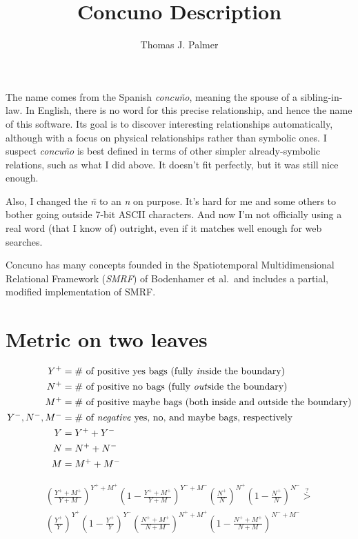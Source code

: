 \documentclass[12pt,twoside]{article}
\title{Concuno Description}
\author{Thomas J. Palmer}
\newcommand{\term}[1]{\emph{#1}}
\begin{document}
\maketitle

The name comes from the Spanish \term{concu\~no}, meaning the spouse of a
sibling-in-law. In English, there is no word for this precise relationship, and
hence the name of this software. Its goal is to discover interesting
relationships automatically, although with a focus on physical relationships
rather than symbolic ones. I suspect \term{concu\~no} is best defined in
terms of other simpler already-symbolic relations, such as what I did above.
It doesn't fit perfectly, but it was still nice enough.

Also, I changed the \term{\~n} to an \term{n} on purpose. It's hard for me and
some others to bother going outside 7-bit ASCII characters. And now I'm not
officially using a real word (that I know of) outright, even if it matches well
enough for web searches.

Concuno has many concepts founded in the Spatiotemporal Multidimensional
Relational Framework (\term{SMRF}) of Bodenhamer et al.\ and includes a partial,
modified implementation of SMRF.


\section{Metric on two leaves}

\begin{align*}
  Y^+ &= \text{\# of positive yes bags (fully \emph{in}side the boundary)} \\
  N^+ &= \text{\# of positive no bags (fully \emph{out}side the boundary)} \\
  M^+ &=
    \text{\# of positive maybe bags (both inside and outside the boundary)} \\
  Y^-, N^-, M^- &=
    \text{\# of \term{negative} yes, no, and maybe bags, respectively} \\
  Y &= Y^+ + Y^- \\
  N &= N^+ + N^- \\
  M &= M^+ + M^-
\end{align*}

\begin{multline}
  \left(\frac{Y^+ + M^+}{Y + M}\right)^{Y^+ + M^+}
  \left(1 - \frac{Y^+ + M^+}{Y + M}\right)^{Y^- + M^-}
  \left(\frac{N^+}{N}\right)^{N^+}
  \left(1 - \frac{N^+}{N}\right)^{N^-}
  \stackrel{?}{>} \\
  \left(\frac{Y^+}{Y}\right)^{Y^+}
  \left(1 - \frac{Y^+}{Y}\right)^{Y^-}
  \left(\frac{N^+ + M^+}{N + M}\right)^{N^+ + M^+}
  \left(1 - \frac{N^+ + M^+}{N + M}\right)^{N^- + M^-}
\end{multline}
\end{document}
